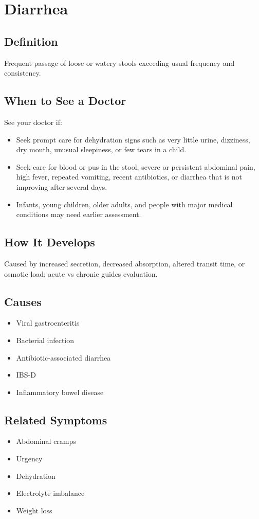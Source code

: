 \chapter{Diarrhea}

\section*{Definition}
Frequent passage of loose or watery stools exceeding usual frequency and consistency.

\section*{When to See a Doctor}
See your doctor if:
\begin{itemize}
  \item Seek prompt care for dehydration signs such as very little urine, dizziness, dry mouth, unusual sleepiness, or few tears in a child.
  \item Seek care for blood or pus in the stool, severe or persistent abdominal pain, high fever, repeated vomiting, recent antibiotics, or diarrhea that is not improving after several days.
  \item Infants, young children, older adults, and people with major medical conditions may need earlier assessment.
\end{itemize}

\section*{How It Develops}
Caused by increased secretion, decreased absorption, altered transit time, or osmotic load; acute vs chronic guides evaluation.

\section*{Causes}
\begin{itemize}
  \item Viral gastroenteritis
  \item Bacterial infection
  \item Antibiotic-associated diarrhea
  \item IBS-D
  \item Inflammatory bowel disease
\end{itemize}

\section*{Related Symptoms}
\begin{itemize}
  \item Abdominal cramps
  \item Urgency
  \item Dehydration
  \item Electrolyte imbalance
  \item Weight loss
\end{itemize}

